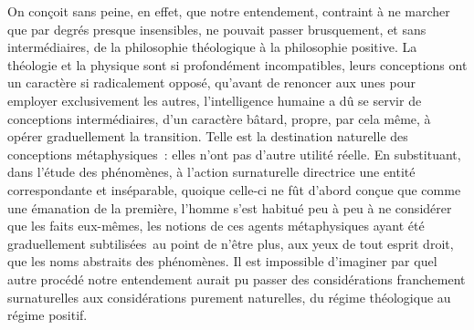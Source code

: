 \documentclass[french,twoside]{book} %
\begin{document}
On conçoit sans peine, en effet, que notre entendement, contraint à ne marcher que par degrés presque insensibles, ne pouvait passer brusquement, et sans intermédiaires, de la philosophie théologique à la philosophie positive. La théologie et la physique sont si profondément incompatibles, leurs conceptions ont un caractère si radicalement opposé, qu’avant de renoncer aux unes pour employer exclusivement les autres, l’intelligence humaine a dû se servir de conceptions intermédiaires, d’un caractère bâtard, propre, par cela même, à opérer graduellement la transition. Telle est la destination naturelle des conceptions métaphysiques : elles n’ont pas d’autre utilité réelle. En substituant, dans l’étude des phénomènes, à l’action surnaturelle directrice une entité correspondante et inséparable, quoique celle-ci ne fût d’abord conçue que comme une émanation de la première, l’homme s’est habitué peu à peu à ne considérer que les faits eux-mêmes, les notions de ces agents métaphysiques ayant été graduellement subtilisées au point de n’être plus, aux yeux de tout esprit droit, que les noms abstraits des phénomènes. Il est impossible d’imaginer par quel autre procédé notre entendement aurait pu passer des considérations franchement surnaturelles aux considérations purement naturelles, du régime théologique au régime positif.
\end{document}
